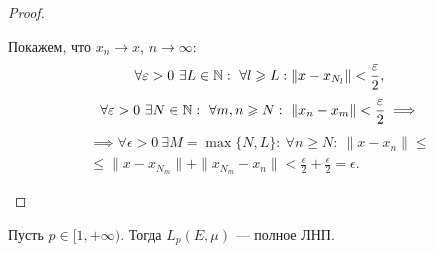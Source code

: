 \begin{proof}
\begin{itemize}
    Покажем, что $x_n \to x$, $n \to \infty$:
    \[\forall \varepsilon > 0 \ \exists L \in \mathbb{N}: \ \forall l \geqslant L: \|x - x_{N_l}\| < \frac{\varepsilon}{2},\]
    \[\forall \varepsilon > 0 \ \exists N \in \mathbb{N}: \ \forall m,n \geqslant N: \ \|x_n - x_m\| < \frac{\varepsilon}{2} \implies\]
    \begin{multline*}
        \implies \forall \epsilon > 0 \ \exists M = \max\{N,L\}: \ \forall n \geqslant N: \ \|x - x_n\| \leqslant\\\leqslant \|x - x_{N_m}\| + \|x_{N_m} - x_n\| < \frac{\epsilon}{2} + \frac{\epsilon}{2} = \epsilon.
    \end{multline*} 
    \end{itemize}
\end{proof} 

\begin{theorem}
    Пусть $p \in [1, +\infty)$. Тогда $L_p(E,\mu)$ — полное ЛНП.
\end{theorem} 
